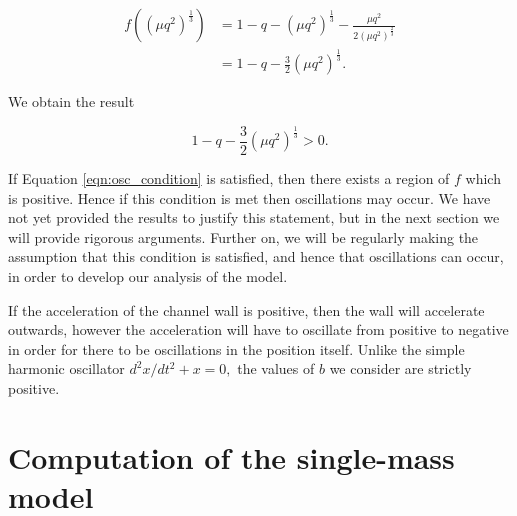 \documentclass{article}
\begin{document}
\begin{align}
    f((\mu q^2)^{\frac{1}{3}}) &= 1 - q - (\mu q^2)^{\frac{1}{3}} - \frac{\mu q^2}{2(\mu q^2)^{\frac{2}{3}}} \\
    &= 1 - q - \frac{3}{2}(\mu q^2)^{\frac{1}{3}}.
\end{align}

We obtain the result

\begin{equation}
    1 - q - \frac{3}{2}(\mu q^2)^{\frac{1}{3}} > 0.
    \label{eqn:osc_condition}
\end{equation}

If Equation \ref{eqn:osc_condition} is satisfied,
then there exists a region of $f$ which is positive.
Hence if this condition is met then oscillations may occur. %
We have not yet provided the results to justify this statement, but in the next section we will provide rigorous arguments. %
Further on, we will be regularly making the assumption that this condition is satisfied,
and hence that oscillations can occur,
in order to develop our analysis of the model.


If the acceleration of the channel wall is positive, then the wall will accelerate outwards,
however the acceleration will have to oscillate from positive to negative in order for there to be oscillations in the position itself.
Unlike the simple harmonic oscillator $d^2 x/dt^2 + x = 0,$ the values of $b$ we consider are strictly positive.

\section{Computation of the single-mass model}

\end{document}

